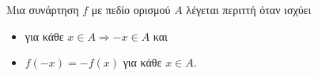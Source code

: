 Μια συνάρτηση $ f $ με πεδίο ορισμού $ A $ λέγεται περιττή όταν ισχύει
\begin{itemize}
\item για κάθε $ x\in A\Rightarrow -x\in A $ και 
\item $ f(-x)=-f(x) $ για κάθε $ x\in A $.
\end{itemize}
